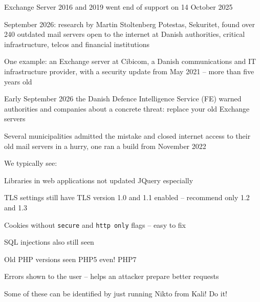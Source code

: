 \documentclass[Screen16to9,17pt]{foils}
\begin{document}
\begin{list2}
\item Exchange Server 2016 and 2019 went end of support on 14 October 2025
\item September 2026: research by Martin Stoltenberg Potestas, Sekuritet, found over 240 outdated mail servers open to the internet at Danish authorities, critical infrastructure, telcos and financial institutions\\
{\footnotesize{}}
\item One example: an Exchange server at Cibicom, a Danish communications and IT infrastructure provider, with a security update from May 2021 -- more than five years old\\
{\footnotesize{}}
\item Early September 2026 the Danish Defence Intelligence Service (FE) warned authorities and companies about a concrete threat: replace your old Exchange servers
\item Several municipalities admitted the mistake and closed internet access to their old mail servers in a hurry, one ran a build from November 2022\\
{\footnotesize{}}
\end{list2}




We typically see:
\begin{list2}
\item Libraries in web applications not updated JQuery especially
\item TLS settings still have TLS version 1.0 and 1.1 enabled -- recommend only 1.2 and 1.3
\item Cookies without \verb+secure+ and \verb+http only+ flags -- easy to fix
\item SQL injections also still seen
\item Old PHP versions seen PHP5 even! PHP7
\item Errors shown to the user -- helps an attacker prepare better requests
\end{list2}

Some of these can be identified by just running Nikto from Kali! Do it!

\end{document}
